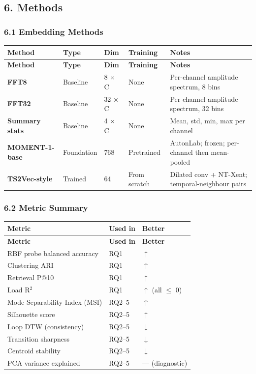 \documentclass[11pt,a4paper]{article}
\begin{document}
\subsection{6. Methods}

\subsubsection{6.1 Embedding Methods}

\begin{longtable}{|l|l|l|l|l|}
\hline
\textbf{Method} & \textbf{Type} & \textbf{Dim} & \textbf{Training} & \textbf{Notes} \\
\hline
\endfirsthead
\hline
\textbf{Method} & \textbf{Type} & \textbf{Dim} & \textbf{Training} & \textbf{Notes} \\
\hline
\endhead
\hline
\endfoot
\textbf{FFT8} & Baseline & 8 × C & None & Per-channel amplitude spectrum, 8 bins \\
\hline
\textbf{FFT32} & Baseline & 32 × C & None & Per-channel amplitude spectrum, 32 bins \\
\hline
\textbf{Summary stats} & Baseline & 4 × C & None & Mean, std, min, max per channel \\
\hline
\textbf{MOMENT-1-base} & Foundation & 768 & Pretrained & AutonLab; frozen; per-channel then mean-pooled \\
\hline
\textbf{TS2Vec-style} & Trained & 64 & From scratch & Dilated conv + NT-Xent; temporal-neighbour pairs \\
\hline
\end{longtable}

\subsubsection{6.2 Metric Summary}

\begin{longtable}{|l|l|l|}
\hline
\textbf{Metric} & \textbf{Used in} & \textbf{Better} \\
\hline
\endfirsthead
\hline
\textbf{Metric} & \textbf{Used in} & \textbf{Better} \\
\hline
\endhead
\hline
\endfoot
RBF probe balanced accuracy & RQ1 & $\uparrow$ \\
\hline
Clustering ARI & RQ1 & $\uparrow$ \\
\hline
Retrieval P@10 & RQ1 & $\uparrow$ \\
\hline
Load R$^2$ & RQ1 & $\uparrow$ (all $\leq$ 0) \\
\hline
Mode Separability Index (MSI) & RQ2--5 & $\uparrow$ \\
\hline
Silhouette score & RQ2--5 & $\uparrow$ \\
\hline
Loop DTW (consistency) & RQ2--5 & $\downarrow$ \\
\hline
Transition sharpness & RQ2--5 & $\downarrow$ \\
\hline
Centroid stability & RQ2--5 & $\downarrow$ \\
\hline
PCA variance explained & RQ2--5 & --- (diagnostic) \\
\hline
\end{longtable}
\end{document}
